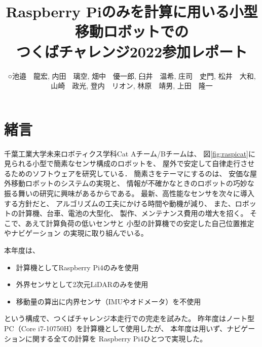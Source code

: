 \documentclass[twocolumn,9pt]{jsproceedings}
\title{Raspberry Piのみを計算に用いる小型移動ロボットでの\\つくばチャレンジ2022参加レポート}
\author{○池邉　龍宏\authorrefmark{1}, 内田　璃空\authorrefmark{1}, 畑中　優一郎\authorrefmark{1}, 臼井　温希\authorrefmark{1}, 庄司　史門\authorrefmark{1}, 松井　大和\authorrefmark{1}, \\
山崎　政光\authorrefmark{1}, 登内　リオン\authorrefmark{1}, 林原　靖男\authorrefmark{1}, 上田　隆一\authorrefmark{1}}
\affiliation{千葉工業大学 未来ロボティクス学科 Cat Aチーム/Bチーム}
\begin{document}
\maketitle



\section{緒言}

千葉工業大学未来ロボティクス学科Cat Aチーム/Bチームは、
図\ref{fig:raspicat}に見られる小型で簡素なセンサ構成のロボットを、
屋外で安定して自律走行させるためのソフトウェアを研究している．
簡素さをテーマにするのは、
安価な屋外移動ロボットのシステムの実現と、
情報が不確かなときのロボットの巧妙な振る舞いの研究に興味があるからである。
最新、高性能なセンサを次々に導入する方針だと、
アルゴリズムの工夫にかける時間や動機が減り、
また、ロボットの計算機、台車、電池の大型化、
製作、メンテナンス費用の増大を招く。
そこで、あえて計算負荷の低いセンサと
小型の計算機での安定した自己位置推定やナビゲーション
の実現に取り組んでいる。


本年度は、
\begin{itemize}
\item 計算機としてRaspberry Pi4のみを使用
\item 外界センサとして2次元LiDARのみを使用
\item 移動量の算出に内界センサ（IMUやオドメータ）を不使用
\end{itemize}
という構成で、つくばチャレンジ本走行での完走を試みた。
昨年度はノート型PC（Core i7-10750H）を計算機として使用したが、
本年度は用いず、ナビゲーションに関する全ての計算を
Raspberry Pi4ひとつで実現した。
\end{document}
